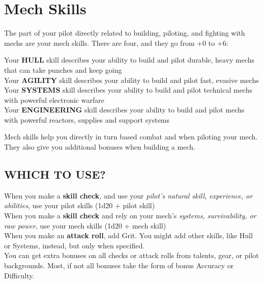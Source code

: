 \section{Mech Skills}

The part of your pilot directly related to building, piloting, and fighting with mechs are your mech
skills. There are four, and they go from +0 to +6:

Your \textbf{HULL} skill describes your ability to build and pilot durable, heavy mechs that can take
punches and keep going \\
Your \textbf{AGILITY} skill describes your ability to build and pilot fast,
evasive mechs \\
Your \textbf{SYSTEMS} skill describes your ability to build and pilot technical mechs with powerful
electronic warfare \\
Your \textbf{ENGINEERING} skill describes your ability to build and pilot mechs with powerful reactors,
supplies and support systems

Mech skills help you directly in turn based combat and when piloting your mech. They also give
you additional bonuses when building a mech.

\subsection{WHICH TO USE?}

When you make a \textbf{skill check}, and use your \textit{pilot’s natural skill, experience, or abilities}, use your
pilot skills (1d20 + pilot skill) \\
When you make a \textbf{skill check} and rely on your mech’s \textit{systems, survivability, or raw power}, use
your mech skills (1d20 + mech skill) \\
When you make an \textbf{attack roll}, add Grit. You might add other skills, like Hull or Systems, instead,
but only when specified. \\

You can get extra bonuses on all checks or attack rolls from talents, gear, or pilot backgrounds.
Most, if not all bonuses take the form of bonus Accuracy or Difficulty.